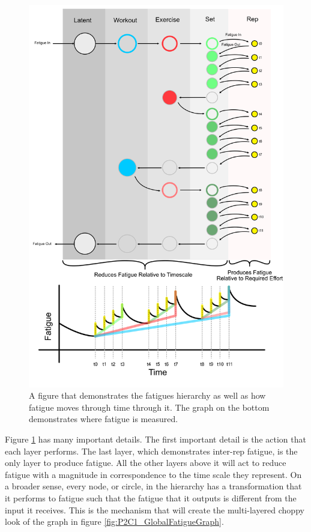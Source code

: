 \begin{figure}[htbp]
    \centering
    \includegraphics[scale=0.55]{images/ch2/FatigueThroughTime.png}
    \caption{A figure that demonstrates the fatigues hierarchy as well as how fatigue moves through time through it. The graph on the bottom demonstrates where fatigue is measured.}
    \label{fig:P2C1_FatigueHierarchyTimeGraph}
\end{figure}

Figure \ref{fig:P2C1_FatigueHierarchyTimeGraph} has many important details. The first important detail is the action that each layer performs. The last layer, which demonstrates inter-rep fatigue, is the only layer to produce fatigue. All the other layers above it will act to reduce fatigue with a magnitude in correspondence to the time scale they represent. On a broader sense, every node, or circle, in the hierarchy has a transformation that it performs to fatigue such that the fatigue that it outputs is different from the input it receives. This is the mechanism that will create the multi-layered choppy look of the graph in figure \ref{fig:P2C1_GlobalFatigueGraph}. 

